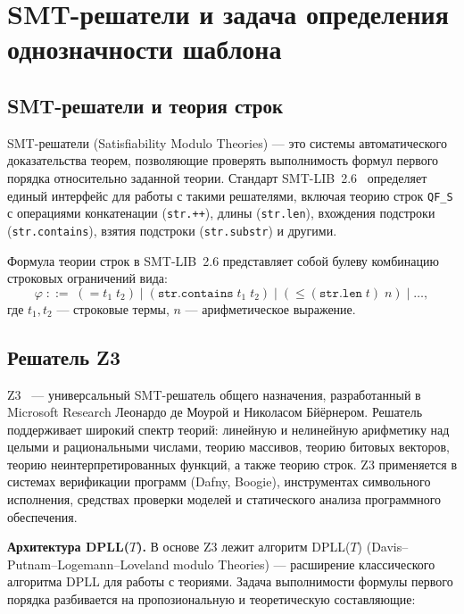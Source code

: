 \documentclass[14pt, russian]{scrartcl}
\begin{document}
\section{SMT-решатели и задача определения однозначности шаблона}

\subsection{SMT-решатели и теория строк}

SMT-решатели (Satisfiability Modulo Theories) --- это системы автоматического
доказательства теорем, позволяющие проверять выполнимость формул первого порядка
относительно заданной теории. Стандарт SMT-LIB~2.6~\cite{barrett2017} определяет
единый интерфейс для работы с такими решателями, включая теорию строк \texttt{QF\_S}
с операциями конкатенации ({\tt str.++}), длины ({\tt str.len}), вхождения подстроки
({\tt str.contains}), взятия подстроки ({\tt str.substr}) и другими.

Формула теории строк в SMT-LIB~2.6 представляет собой булеву комбинацию
строковых ограничений вида:
\begin{equation}
  \varphi \;::=\; (= t_1\; t_2) \mid (\texttt{str.contains}\; t_1\; t_2) \mid
  (\leq (\texttt{str.len}\; t)\; n) \mid \ldots,
\end{equation}
где $t_1, t_2$ --- строковые термы, $n$ --- арифметическое выражение.



\subsection{Решатель Z3}

Z3~\cite{demoura2008} --- универсальный SMT-решатель общего назначения, разработанный
в Microsoft Research Леонардо де Моурой и Николасом Бйёрнером. Решатель поддерживает
широкий спектр теорий: линейную и нелинейную арифметику над целыми и рациональными
числами, теорию массивов, теорию битовых векторов, теорию неинтерпретированных
функций, а также теорию строк. Z3 применяется в системах верификации программ
(Dafny, Boogie), инструментах символьного исполнения, средствах проверки моделей
и статического анализа программного обеспечения.

\medskip\noindent\textbf{Архитектура DPLL($T$).}
В основе Z3 лежит алгоритм DPLL($T$) (Davis--Putnam--Logemann--Loveland modulo
Theories) --- расширение классического алгоритма DPLL для работы с теориями.
Задача выполнимости формулы первого порядка разбивается на пропозиональную
и теоретическую составляющие:
\end{document}

